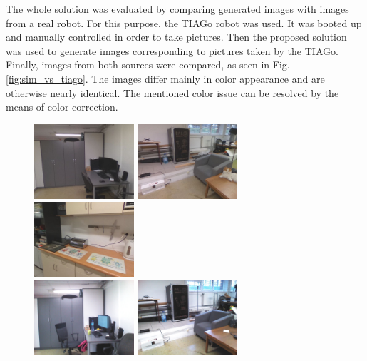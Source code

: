 \documentclass{svproc}
\begin{document}
The whole solution was evaluated by comparing generated images with images from a real robot.
For this purpose, the TIAGo robot was used.
It was booted up and manually controlled in order to take pictures.
Then the proposed solution was used to generate images corresponding to pictures taken by the TIAGo.
Finally, images from both sources were compared, as seen in Fig. \ref{fig:sim_vs_tiago}. The images 
differ mainly in color appearance and are otherwise nearly identical. The mentioned color issue can 
be resolved by the means of color correction.

\begin{figure}[!ht]
    \centering
    \includegraphics[width=0.33\textwidth]{img/sim_vs_tiago/sim_biurko.jpg}\hfill%
    \includegraphics[width=0.33\textwidth]{img/sim_vs_tiago/sim_fotel.jpg}\hfill%
    \includegraphics[width=0.33\textwidth]{img/sim_vs_tiago/sim_kuchnia_blat.jpg}\\
    \includegraphics[width=0.33\textwidth]{img/sim_vs_tiago/tia_biurko.jpg}\hfill%
    \includegraphics[width=0.33\textwidth]{img/sim_vs_tiago/tia_fotel.jpg}\hfill%

\end{figure}
\end{document}
